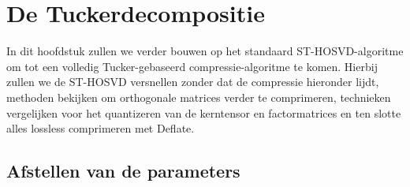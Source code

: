 \chapter{De Tuckerdecompositie}
\label{hoofdstuk:tucker}

In dit hoofdstuk zullen we verder bouwen op het standaard ST-HOSVD-algoritme om tot een volledig Tucker-gebaseerd compressie-algoritme te komen. Hierbij zullen we de ST-HOSVD versnellen zonder dat de compressie hieronder lijdt, methoden bekijken om orthogonale matrices verder te comprimeren, technieken vergelijken voor het quantizeren van de kerntensor en factormatrices en ten slotte alles lossless comprimeren met Deflate.





\section{Afstellen van de parameters}